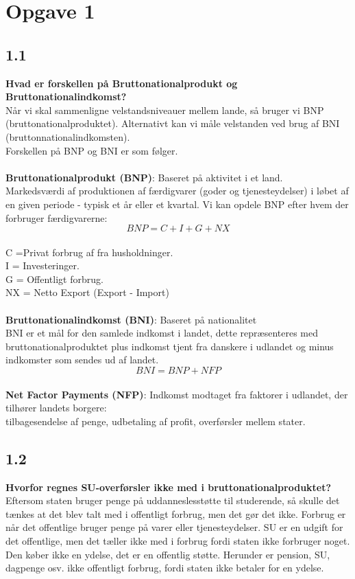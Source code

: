 \documentclass[a4paper, 12pt]{article}
\begin{document}
 


\section*{Opgave 1} %

\subsection*{1.1}
\textbf{Hvad er forskellen på Bruttonationalprodukt og Bruttonationalindkomst?}
\\
Når vi skal sammenligne velstandsniveauer mellem lande, så bruger vi BNP (bruttonationalproduktet). Alternativt kan vi måle velstanden ved brug af BNI (bruttonnationalindkomsten).
\\
Forskellen på BNP og BNI er som følger.
\\\\
\textbf{Bruttonationalprodukt (BNP)}: Baseret på aktivitet i et land. 
\\
Markedsværdi af produktionen af færdigvarer (goder og tjenesteydelser) i løbet af en given periode - typisk et år eller et kvartal. Vi kan opdele BNP efter hvem der forbruger færdigvarerne:
$$BNP = C + I + G + NX$$
\\
C =Privat forbrug af fra husholdninger.\\
I = Investeringer.\\
G = Offentligt forbrug.\\
NX = Netto Export (Export - Import)\\\\


\textbf{Bruttonationalindkomst (BNI)}: Baseret på nationalitet
\\
BNI er et mål for den samlede indkomst i landet, dette repræsenteres med bruttonationalproduktet plus indkomst tjent fra danskere i udlandet og minus indkomster som sendes ud af landet.
$$BNI = BNP + NFP$$
\\
\textbf{Net Factor Payments (NFP)}: Indkomst modtaget fra faktorer i udlandet, der tilhører landets borgere:\\
tilbagesendelse af penge, udbetaling af profit, overførsler mellem stater.
\subsection*{1.2}
\textbf{Hvorfor regnes SU-overførsler ikke med i bruttonationalproduktet?}\\
Eftersom staten bruger penge på uddanneslesstøtte til studerende, så skulle det tænkes at det blev talt med i offentligt forbrug, men det gør det ikke. Forbrug er når det offentlige bruger penge på varer eller tjenesteydelser. SU er en udgift for det offentlige, men det tæller ikke med i forbrug fordi staten ikke forbruger noget. Den køber ikke en ydelse, det er en offentlig støtte.  Herunder er pension, SU, dagpenge osv. ikke offentligt forbrug, fordi staten ikke betaler for en ydelse.
\end{document}

